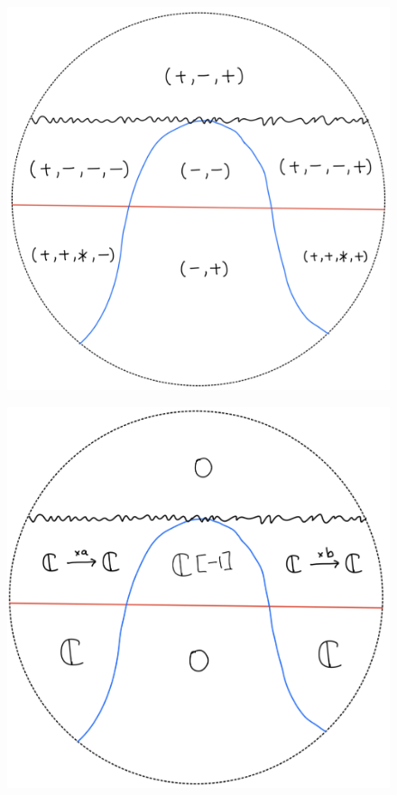 \begin{figure}[H]
    \centering
    \includegraphics[scale = 0.95]{diagrams/lemma2/32.png} 
    \caption{}
    \label{fig:your-label}
\end{figure}
\begin{figure}[H]
    \centering
    \includegraphics[scale = 0.95]{diagrams/lemma2/33.png} 
    \caption{}
    \label{fig:your-label}
\end{figure}
